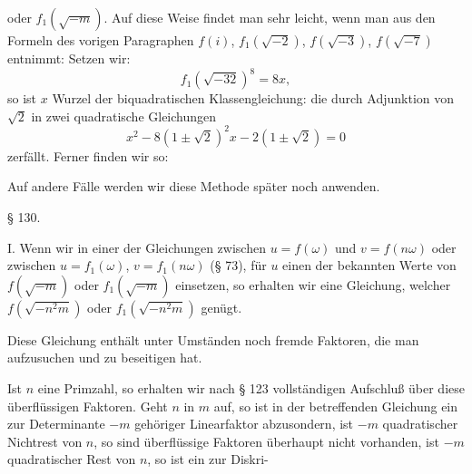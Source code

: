oder $f_1(\sqrt{-m})$. Auf diese Weise findet man sehr leicht, wenn
man aus den Formeln des vorigen Paragraphen $f(i)$, $f_1(\sqrt{-2})$,
$f(\sqrt{-3})$, $f(\sqrt{-7})$ entnimmt:
Setzen wir:
\[
f_1(\sqrt{-32})^8 = 8x,
\]
so ist $x$ Wurzel der biquadratischen Klassengleichung:
die durch Adjunktion von $\sqrt2$ in zwei quadratische Gleichungen
\[
x^2-8(1\pm\sqrt2)^2x-2(1\pm\sqrt2)=0
\]
zerfällt. Ferner finden wir so:

Auf andere Fälle werden wir diese Methode später noch anwenden.

§ 130.


I. Wenn wir in einer der Gleichungen zwischen $u=f(\omega)$
und $v=f(n\omega)$ oder zwischen $u=f_1(\omega)$, $v=f_1(n\omega)$ (§ 73),
für $u$ einen der bekannten Werte von $f(\sqrt{-m})$ oder $f_1(\sqrt{-m})$
einsetzen, so erhalten wir eine Gleichung, welcher $f(\sqrt{-n^2m})$
oder $f_1(\sqrt{-n^2m})$ genügt.

Diese Gleichung enthält unter Umständen noch fremde Faktoren, die man
aufzusuchen und zu beseitigen hat.

Ist $n$ eine Primzahl, so erhalten wir nach § 123 vollständigen
Aufschluß über diese überflüssigen Faktoren. Geht $n$ in $m$ auf,
so ist in der betreffenden Gleichung ein zur Determinante $-m$
gehöriger Linearfaktor abzusondern, ist $-m$ quadratischer Nichtrest
von $n$, so sind überflüssige Faktoren überhaupt nicht vorhanden,
ist $-m$ quadratischer Rest von $n$, so ist ein zur Diskri-
